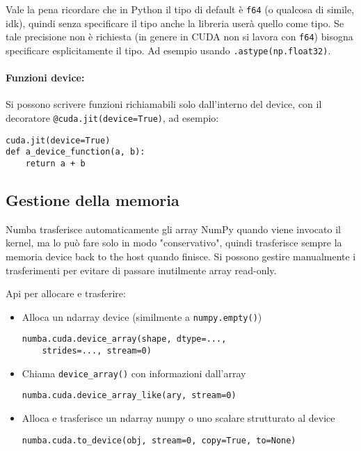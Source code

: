 Vale la pena ricordare che in Python il tipo di default è \texttt{f64} (o qualcosa di simile, idk), quindi senza specificare il tipo anche la libreria userà quello come tipo. Se tale precisione non è richiesta (in genere in CUDA non si lavora con \texttt{f64}) bisogna specificare esplicitamente il tipo. Ad esempio usando \texttt{.astype(np.float32)}.

\paragraph{Funzioni device:} Si possono scrivere funzioni richiamabili solo dall'interno del device, con il decoratore \texttt{@cuda.jit(device=True)}, ad esempio:
\begin{verbatim}
cuda.jit(device=True)
def a_device_function(a, b):
    return a + b
\end{verbatim}

\subsection{Gestione della memoria}

Numba trasferisce automaticamente gli array NumPy quando viene invocato il kernel, ma lo può fare solo in modo "conservativo", quindi trasferisce sempre la memoria device back to the host quando finisce. Si possono gestire manualmente i trasferimenti per evitare di passare inutilmente array read-only.

Api per allocare e trasferire:
\begin{itemize}
	\item Alloca un ndarray device (similmente a \texttt{numpy.empty()})
	\begin{verbatim}
numba.cuda.device_array(shape, dtype=..., 
    strides=..., stream=0)
	\end{verbatim}
	
	\item Chiama \texttt{device\_array()} con informazioni dall'array
	\begin{verbatim}
numba.cuda.device_array_like(ary, stream=0)
	\end{verbatim}
	
	\item Alloca e trasferisce un ndarray numpy o uno scalare strutturato al device
	\begin{verbatim}
numba.cuda.to_device(obj, stream=0, copy=True, to=None)
	\end{verbatim}
\end{itemize}

